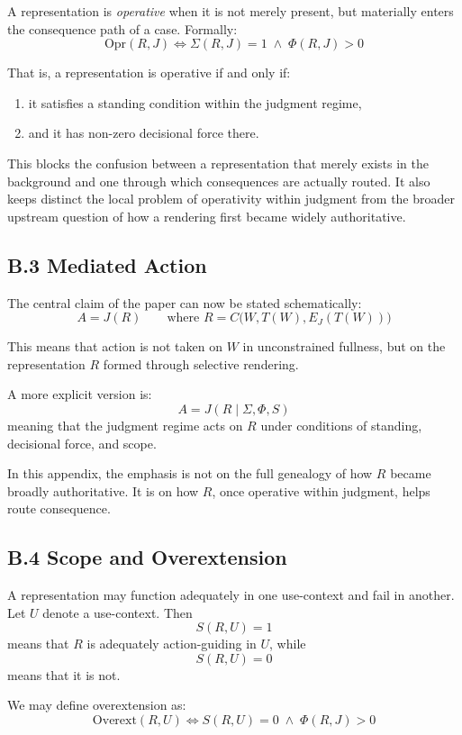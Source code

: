\documentclass[11pt]{article}
\renewcommand{\emph}[1]{\textit{#1}}
\begin{document}
A representation is \emph{operative} when it is not merely present, but materially enters the consequence path of a case. Formally:
\[
\mathrm{Opr}(R,J) \iff \Sigma(R,J)=1 \;\wedge\; \Phi(R,J)>0
\]

That is, a representation is operative if and only if:
\begin{enumerate}
    \item it satisfies a standing condition within the judgment regime,
    \item and it has non-zero decisional force there.
\end{enumerate}

This blocks the confusion between a representation that merely exists in the background and one through which consequences are actually routed. It also keeps distinct the local problem of operativity within judgment from the broader upstream question of how a rendering first became widely authoritative.

\subsection*{B.3 Mediated Action}

The central claim of the paper can now be stated schematically:
\[
A = J(R)
\qquad \text{where } R = C\big(W,T(W),E_J(T(W))\big)
\]

This means that action is not taken on \(W\) in unconstrained fullness, but on the representation \(R\) formed through selective rendering.

A more explicit version is:
\[
A = J(R \mid \Sigma,\Phi,S)
\]
meaning that the judgment regime acts on \(R\) under conditions of standing, decisional force, and scope.

In this appendix, the emphasis is not on the full genealogy of how \(R\) became broadly authoritative. It is on how \(R\), once operative within judgment, helps route consequence.

\subsection*{B.4 Scope and Overextension}

A representation may function adequately in one use-context and fail in another. Let \(U\) denote a use-context. Then
\[
S(R,U)=1
\]
means that \(R\) is adequately action-guiding in \(U\), while
\[
S(R,U)=0
\]
means that it is not.

We may define overextension as:
\[
\mathrm{Overext}(R,U) \iff S(R,U)=0 \;\wedge\; \Phi(R,J)>0
\]
\end{document}
